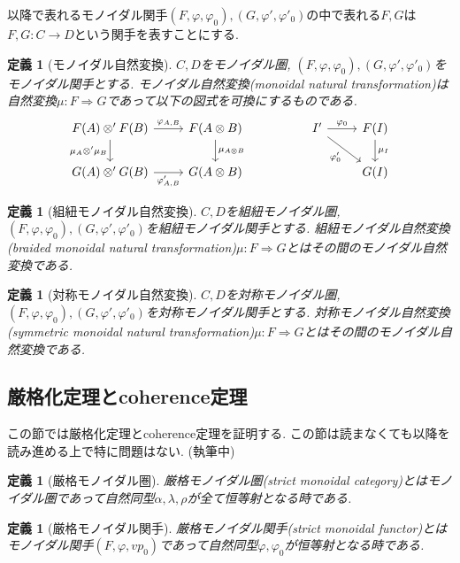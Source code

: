 \documentclass[a4paper,12pt]{ltjsarticle}
\theoremstyle{break}
\newtheorem{defn}[thm]{定義}
\newcommand{\al}{\alpha}
\newcommand{\la}{\lambda}
\newcommand{\vp}{\varphi}
\newcommand{\ra}{\Rightarrow}
\newcommand{\ot}{\otimes}
\numberwithin{equation}{section}
\begin{document}
以降で表れるモノイダル関手$(F,\vp,\vp_0),(G,\vp',\vp'_0)$の中で表れる$F,G$は$F,G: C \to D$という関手を表すことにする.

\begin{defn}[モノイダル自然変換]
  $C,D$をモノイダル圏, $(F,\vp,\vp_0),(G,\vp',\vp'_0)$をモノイダル関手とする. 
  モノイダル自然変換(monoidal natural transformation)は自然変換$\mu: F \ra G$であって以下の図式を可換にするものである. 
  \[\begin{tikzcd}
    {F(A) \ot' F(B)} & {F(A \ot B)} && {I'} & {F(I)} \\
    {G(A) \ot' G(B)} & {G(A \ot B)} &&& {G(I)}
    \arrow["{\mu_A \ot' \mu_B}"', from=1-1, to=2-1]
    \arrow["{\vp_{A,B}}", from=1-1, to=1-2]
    \arrow["{\mu_{A \ot B}}", from=1-2, to=2-2]
    \arrow["{\vp_{A,B}'}"', from=2-1, to=2-2]
    \arrow["{\vp_0}", from=1-4, to=1-5]
    \arrow["{\mu_I}", from=1-5, to=2-5]
    \arrow["{\vp_0'}"', from=1-4, to=2-5]
  \end{tikzcd}\]
\end{defn}

\begin{defn}[組紐モノイダル自然変換]
  $C,D$を組紐モノイダル圏, $(F,\vp,\vp_0),(G,\vp',\vp'_0)$を組紐モノイダル関手とする.  
  組紐モノイダル自然変換(braided monoidal natural transformation)$\mu: F \ra G$とはその間のモノイダル自然変換である. 
\end{defn}

\begin{defn}[対称モノイダル自然変換]
  $C,D$を対称モノイダル圏, $(F,\vp,\vp_0),(G,\vp',\vp'_0)$を対称モノイダル関手とする.  
  対称モノイダル自然変換(symmetric monoidal natural transformation)$\mu: F \ra G$とはその間のモノイダル自然変換である. 
\end{defn}

\subsection{厳格化定理とcoherence定理}

この節では厳格化定理とcoherence定理を証明する. 
この節は読まなくても以降を読み進める上で特に問題はない. 
(執筆中)

\begin{defn}[厳格モノイダル圏]
  厳格モノイダル圏(strict monoidal category)とはモノイダル圏であって自然同型$\al,\la,\rho$が全て恒等射となる時である. 
\end{defn}

\begin{defn}[厳格モノイダル関手]
  厳格モノイダル関手(strict monoidal functor)とはモノイダル関手$(F,\vp,vp_0)$であって自然同型$\vp,\vp_0$が恒等射となる時である. 
\end{defn}
\end{document}
